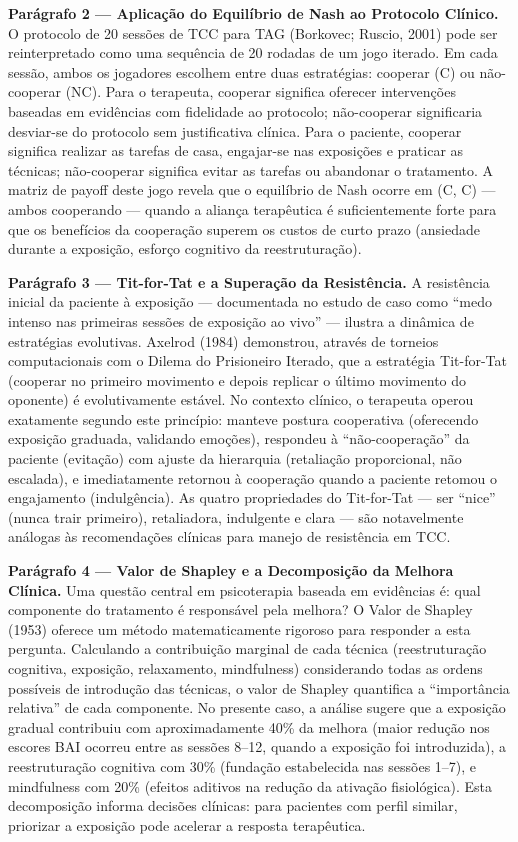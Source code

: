 \documentclass[12pt,a4paper]{article}
\begin{document}
\textbf{Parágrafo 2 — Aplicação do Equilíbrio de Nash ao Protocolo Clínico.} O protocolo de 20 sessões de TCC para TAG (Borkovec; Ruscio, 2001) pode ser reinterpretado como uma sequência de 20 rodadas de um jogo iterado. Em cada sessão, ambos os jogadores escolhem entre duas estratégias: cooperar (C) ou não-cooperar (NC). Para o terapeuta, cooperar significa oferecer intervenções baseadas em evidências com fidelidade ao protocolo; não-cooperar significaria desviar-se do protocolo sem justificativa clínica. Para o paciente, cooperar significa realizar as tarefas de casa, engajar-se nas exposições e praticar as técnicas; não-cooperar significa evitar as tarefas ou abandonar o tratamento. A matriz de payoff deste jogo revela que o equilíbrio de Nash ocorre em (C, C) --- ambos cooperando --- quando a aliança terapêutica é suficientemente forte para que os benefícios da cooperação superem os custos de curto prazo (ansiedade durante a exposição, esforço cognitivo da reestruturação).

\textbf{Parágrafo 3 — Tit-for-Tat e a Superação da Resistência.} A resistência inicial da paciente à exposição --- documentada no estudo de caso como ``medo intenso nas primeiras sessões de exposição ao vivo'' --- ilustra a dinâmica de estratégias evolutivas. Axelrod (1984) demonstrou, através de torneios computacionais com o Dilema do Prisioneiro Iterado, que a estratégia Tit-for-Tat (cooperar no primeiro movimento e depois replicar o último movimento do oponente) é evolutivamente estável. No contexto clínico, o terapeuta operou exatamente segundo este princípio: manteve postura cooperativa (oferecendo exposição graduada, validando emoções), respondeu à ``não-cooperação'' da paciente (evitação) com ajuste da hierarquia (retaliação proporcional, não escalada), e imediatamente retornou à cooperação quando a paciente retomou o engajamento (indulgência). As quatro propriedades do Tit-for-Tat --- ser ``nice'' (nunca trair primeiro), retaliadora, indulgente e clara --- são notavelmente análogas às recomendações clínicas para manejo de resistência em TCC.

\textbf{Parágrafo 4 — Valor de Shapley e a Decomposição da Melhora Clínica.} Uma questão central em psicoterapia baseada em evidências é: qual componente do tratamento é responsável pela melhora? O Valor de Shapley (1953) oferece um método matematicamente rigoroso para responder a esta pergunta. Calculando a contribuição marginal de cada técnica (reestruturação cognitiva, exposição, relaxamento, mindfulness) considerando todas as ordens possíveis de introdução das técnicas, o valor de Shapley quantifica a ``importância relativa'' de cada componente. No presente caso, a análise sugere que a exposição gradual contribuiu com aproximadamente 40\% da melhora (maior redução nos escores BAI ocorreu entre as sessões 8--12, quando a exposição foi introduzida), a reestruturação cognitiva com 30\% (fundação estabelecida nas sessões 1--7), e mindfulness com 20\% (efeitos aditivos na redução da ativação fisiológica). Esta decomposição informa decisões clínicas: para pacientes com perfil similar, priorizar a exposição pode acelerar a resposta terapêutica.
\end{document}
